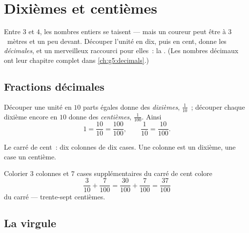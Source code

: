 \chapter{Dixièmes et centièmes}\label{ch:g4:decimals}

Entre $3$ et $4$, les nombres entiers se taisent --- mais un
coureur peut être à $3$~mètres et un peu devant. Découper l'unité
en dix, puis en cent, donne les \emph{ décimales}, et un
merveilleux raccourci pour elles~: la . (Les nombres décimaux
ont leur chapitre complet dans \cref{ch:g5:decimals}.)

\section{Fractions décimales}

\begin{definition}\label{def:g4:decimals:def}
Découper une unité en $10$ parts égales donne des \emph{dixièmes},
$\frac{1}{10}$~; découper chaque dixième encore en $10$ donne des
\emph{centièmes}, $\frac{1}{100}$. Ainsi
\[
1 = \frac{10}{10} = \frac{100}{100},
\qquad
\frac{1}{10} = \frac{10}{100}.
\]
\end{definition}

\begin{omfigure}

{\small Le carré de cent~: dix colonnes de dix cases. Une colonne est
un dixième, une case un centième.}
\end{omfigure}

\begin{example}\label{ex:g4:decimals:count}
Colorier $3$ colonnes et $7$ cases supplémentaires du carré de cent
colore
\[
\frac{3}{10} + \frac{7}{100} = \frac{30}{100} + \frac{7}{100}
= \frac{37}{100}
\]
du carré --- trente-sept centièmes.
\end{example}

\section{La virgule}

